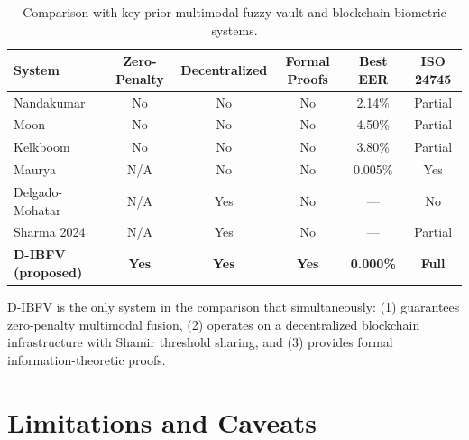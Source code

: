 \begin{table}[h]
\centering
\caption{Comparison with key prior multimodal fuzzy vault and blockchain biometric systems.}
\label{tab:prior_comparison}
\small
\begin{tabular}{@{}lccccc@{}}
\toprule
\textbf{System} & \textbf{Zero-Penalty} & \textbf{Decentralized} & \textbf{Formal Proofs}
 & \textbf{Best EER} & \textbf{ISO 24745} \\
\midrule
Nandakumar \cite{nandakumar2008multibiometric} & No & No & No & 2.14\% & Partial \\
Moon \cite{moon2010multibiometric}             & No & No & No & 4.50\% & Partial \\
Kelkboom \cite{kelkboom2011multialgorithm}               & No & No & No & 3.80\% & Partial \\
Maurya \cite{maurya2025enhancing}              & N/A & No & No & 0.005\% & Yes \\
Delgado-Mohatar \cite{delgado2020blockchain}   & N/A & Yes & No & --- & No \\
Sharma 2024 \cite{sharma2024multimodal}        & N/A & Yes & No & --- & Partial \\
\midrule
\textbf{D-IBFV (proposed)} & \textbf{Yes} & \textbf{Yes} & \textbf{Yes} &
  \textbf{0.000\%} & \textbf{Full} \\
\bottomrule
\end{tabular}
\end{table}

D-IBFV is the only system in the comparison that simultaneously: (1) guarantees
zero-penalty multimodal fusion, (2) operates on a decentralized blockchain
infrastructure with Shamir threshold sharing, and (3) provides formal
information-theoretic proofs.

\section{Limitations and Caveats}
\label{sec:limitations}

